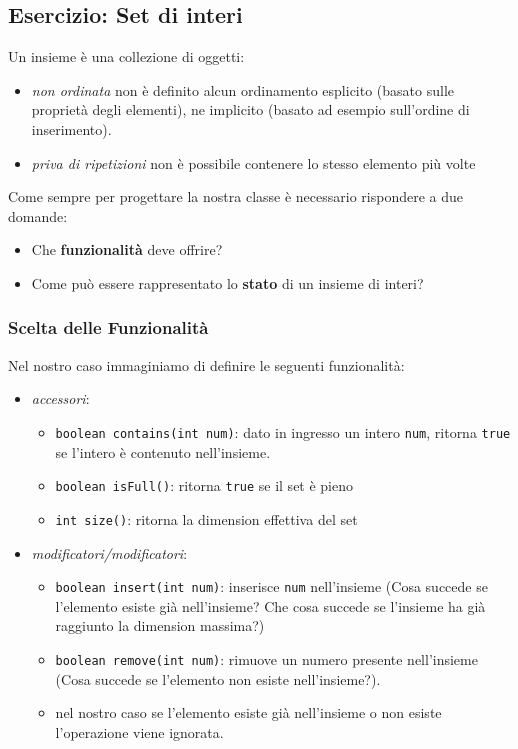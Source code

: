 \documentclass{article}
\begin{document}





\subsection{Esercizio: Set di interi}
Un insieme \`e una collezione di oggetti:
\begin{itemize}
	\item \emph{non ordinata} non è definito alcun ordinamento esplicito (basato sulle proprietà degli elementi),
	ne implicito (basato ad esempio sull'ordine di inserimento).
	\item \emph{priva di ripetizioni} non è possibile contenere lo stesso elemento più volte
\end{itemize}

Come sempre per progettare la nostra classe \`e necessario rispondere a due domande:
\begin{itemize}
		\item Che \textbf{funzionalità} deve offrire?
	\item Come può essere rappresentato lo \textbf{stato} di un insieme di interi?
\end{itemize}

\subsubsection{Scelta delle Funzionalit\`a}

Nel nostro caso immaginiamo di definire le seguenti funzionalit\`a:
\begin{itemize}
\item \emph{accessori}:
\begin{itemize}
\item \texttt{boolean contains(int num)}: dato in ingresso un intero \texttt{num}, ritorna \texttt{true} se l'intero è contenuto nell'insieme.
\item \texttt{boolean isFull()}: ritorna \texttt{true} se il set \`e pieno
\item \texttt{int size()}: ritorna la dimension effettiva del set
\end{itemize}
\item \emph{modificatori/modificatori}:
\begin{itemize}
\item  \texttt{boolean insert(int num)}: inserisce \texttt{num} nell'insieme (Cosa succede se l'elemento esiste gi\`a nell'insieme?
Che cosa succede se l'insieme ha gi\`a raggiunto la dimension massima?)
\item \texttt{boolean remove(int num)}: rimuove un numero presente nell'insieme (Cosa succede se l'elemento non esiste  nell'insieme?).
\item nel nostro caso se l'elemento esiste gi\`a nell'insieme o non esiste l'operazione viene  ignorata.
\end{itemize}
\end{itemize}
\end{document}
